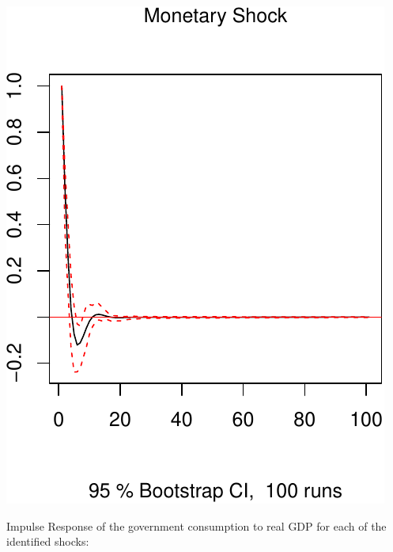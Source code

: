 \documentclass[11pt,preprint, authoryear]{elsarticle}
\numberwithin{equation}{section}
\numberwithin{figure}{section}
\numberwithin{table}{section}
\begin{document}
\includegraphics{TS_proj_files/figure-latex/unnamed-chunk-40-3.pdf}

Impulse Response of the government consumption to real GDP for each of
the identified shocks:
\end{document}
